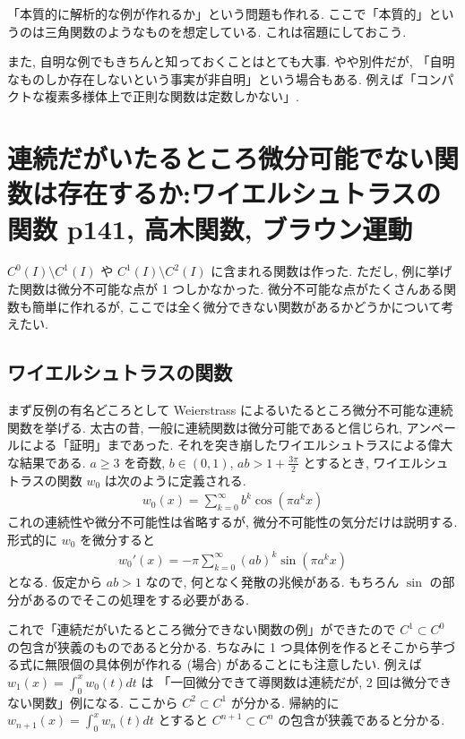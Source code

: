 \documentclass[openany, a4paper, oneside]{jsbook}
\theoremstyle{break}
\theoremstyle{breakdefn}
\begin{document}
「本質的に解析的な例が作れるか」という問題も作れる.
ここで「本質的」というのは三角関数のようなものを想定している.
これは宿題にしておこう.

また, 自明な例でもきちんと知っておくことはとても大事.
やや別件だが, 「自明なものしか存在しないという事実が非自明」という場合もある.
例えば「コンパクトな複素多様体上で正則な関数は定数しかない」.
\section{連続だがいたるところ微分可能でない関数は存在するか:ワイエルシュトラスの関数 \cite{WilliamDumham1} p141, 高木関数, ブラウン運動}


$C^0 (I) \setminus C^1 (I)$ や $C^1 (I) \setminus C^2 (I)$ に含まれる関数は作った.
ただし, 例に挙げた関数は微分不可能な点が 1 つしかなかった.
微分不可能な点がたくさんある関数も簡単に作れるが, ここでは全く微分できない関数があるかどうかについて考えたい.
\subsection{ワイエルシュトラスの関数}


まず反例の有名どころとして Weierstrass によるいたるところ微分不可能な連続関数を挙げる.
太古の昔, 一般に連続関数は微分可能であると信じられ, アンペールによる「証明」まであった.
それを突き崩したワイエルシュトラスによる偉大な結果である.
$a \geq 3$ を奇数, $b \in (0, 1)$, $ab > 1 + \frac{3 \pi}{2}$ とするとき,
ワイエルシュトラスの関数 $w_0$ は次のように定義される.
\begin{align}
 w_0 (x)
 =
 \sum_{k=0}^{\infty} b^k \cos (\pi a^k x)
\end{align}
これの連続性や微分不可能性は省略するが, 微分不可能性の気分だけは説明する.
形式的に $w_0$ を微分すると
\begin{align}
 w_0'(x)
 =
 -\pi \sum_{k=0}^{\infty} (ab)^k \sin (\pi a^k x)
\end{align}
となる.
仮定から $ab > 1$ なので, 何となく発散の兆候がある.
もちろん $\sin$ の部分があるのでそこの処理をする必要がある.

これで「連続だがいたるところ微分できない関数の例」ができたので $C^1 \subset C^0$ の包含が狭義のものであると分かる.
ちなみに 1 つ具体例を作るとそこから芋づる式に無限個の具体例が作れる (場合) があることにも注意したい.
例えば $w_1 (x)=\int_0^x w_0 (t) dt$ は
「一回微分できて導関数は連続だが, 2 回は微分できない関数」例になる.
ここから $C^2 \subset C^1$ が分かる.
帰納的に $w_{n+1}(x)=\int_0^x w_n (t) dt$ とすると $C^{n+1} \subset C^n$ の包含が狭義であると分かる.
\end{document}
